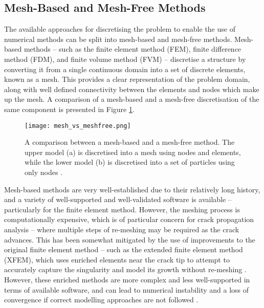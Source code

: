 \subsection{Mesh-Based and Mesh-Free Methods}\label{sec:mesh_meshfree}

The available approaches for discretising the problem to enable the use of numerical methods can be split into mesh-based and mesh-free methods. Mesh-based methods -- such as the finite element method (FEM), finite difference method (FDM), and finite volume method (FVM) -- discretise a structure by converting it from a single continuous domain into a set of discrete elements, known as a mesh. This provides a clear representation of the problem domain, along with well defined connectivity between the elements and nodes which make up the mesh. A comparison of a mesh-based and a mesh-free discretisation of the same component is presented in Figure \ref{fig:mesh_vs_meshfree}.

\begin{figure}[H]
	\centering
	\texttt{[image: mesh\_vs\_meshfree.png]}
	\caption{A comparison between a mesh-based and a mesh-free method. The upper model (a) is discretised into a mesh using nodes and elements, while the lower model (b) is discretised into a set of particles using only nodes \cite{kalutskiy_meshfree_2021}.}
	\label{fig:mesh_vs_meshfree}
\end{figure}

 Mesh-based methods are very well-established due to their relatively long history, and a variety of well-supported and well-validated software is available -- particularly for the finite element method. However, the meshing process is computationally expensive, which is of particular concern for crack propagation analysis -- where multiple steps of re-meshing may be required as the crack advances. This has been somewhat mitigated by the use of improvements to the original finite element method -- such as the extended finite element method (XFEM), which uses enriched elements near the crack tip to attempt to accurately capture the singularity and model its growth without re-meshing \cite{fries_extendedgeneralized_2010-1}. However, these enriched methods are more complex and less well-supported in terms of available software, and can lead to numerical instability and a loss of convergence if correct modelling approaches are not followed \cite{feng_past_2023}.

